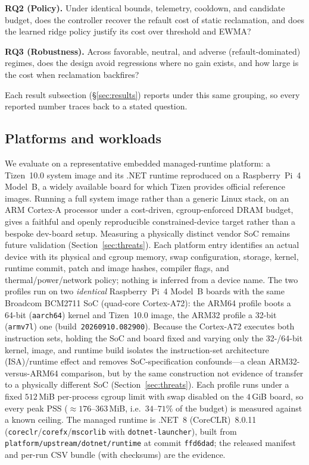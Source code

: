\noindent\textbf{RQ2 (Policy).} Under identical bounds, telemetry, cooldown, and
candidate budget, does the controller recover the refault cost of static
reclamation, and does the learned ridge policy justify its cost over threshold
and EWMA?

\noindent\textbf{RQ3 (Robustness).} Across favorable, neutral, and adverse
(refault-dominated) regimes, does the design avoid regressions where no gain
exists, and how large is the cost when reclamation backfires?
\par\smallskip

\noindent Each result subsection (\S\ref{sec:results}) reports under this same grouping,
so every reported number traces back to a stated question.

\subsection{Platforms and workloads}
We evaluate on a representative embedded managed-runtime platform: a Tizen~10.0
system image and its .NET runtime reproduced on a Raspberry~Pi~4 Model~B, a
widely available board for which Tizen provides official reference images.
Running a full system image rather than a generic Linux stack, on an ARM
Cortex-A processor under a cost-driven, cgroup-enforced DRAM budget, gives a
faithful and openly reproducible constrained-device target rather than a bespoke
dev-board setup. Measuring a physically distinct vendor SoC remains future
validation (Section~\ref{sec:threats}).
Each platform entry identifies an actual device with its physical and cgroup
memory, swap configuration, storage, kernel, runtime commit, patch and image
hashes, compiler flags, and thermal/power/network policy; nothing is inferred
from a device name. The two profiles run on two \emph{identical} Raspberry~Pi~4
Model~B boards with the same Broadcom BCM2711 SoC (quad-core Cortex-A72): the
\textsf{ARM64} profile boots a 64-bit (\texttt{aarch64}) kernel and Tizen~10.0
image, the \textsf{ARM32} profile a 32-bit (\texttt{armv7l}) one
(build~\texttt{20260910.082900}). Because the Cortex-A72 executes both
instruction sets, holding the SoC and board fixed and varying only the
32-/64-bit kernel, image, and runtime build isolates the instruction-set
architecture (ISA)/runtime effect and
removes SoC-specification confounds---a clean ARM32-versus-ARM64 comparison, but
by the same construction not evidence of transfer to a physically different SoC
(Section~\ref{sec:threats}). Each profile runs under a fixed $512$\,MiB
per-process cgroup limit with swap disabled on the $4$\,GiB board, so every peak
PSS ($\approx176$--$363$\,MiB, i.e.\ $34$--$71\%$ of the budget) is measured
against a known ceiling. The managed runtime is .NET~8 (CoreCLR)~8.0.11
(\texttt{coreclr}/\texttt{corefx}/\texttt{mscorlib} with
\texttt{dotnet-launcher}), built from \texttt{platform/upstream/dotnet/runtime}
at commit \texttt{ffd6dad}; the released manifest and per-run CSV bundle (with
checksums) are the evidence.

